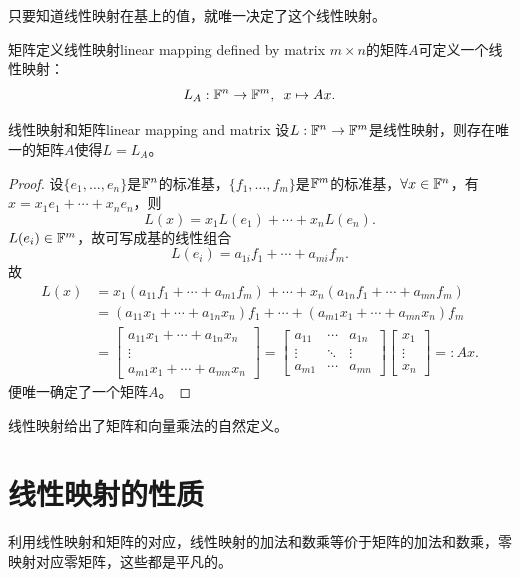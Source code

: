 \begin{remark}
	只要知道线性映射在基上的值，就唯一决定了这个线性映射。
\end{remark}

\begin{example}{矩阵定义线性映射}{linear mapping defined by matrix}
	$m \times n$的矩阵$A$可定义一个线性映射：
	\begin{equation}
		L_A:\mathbb{F}^n \to \mathbb{F}^m,\enspace x \mapsto Ax.
	\end{equation}
\end{example}
\begin{theorem}{线性映射和矩阵}{linear mapping and matrix}
	设$L:\mathbb{F}^n \to \mathbb{F}^m$是线性映射，则存在唯一的矩阵$A$使得$L = L_A$。
\end{theorem}
\begin{proof}
	设$\{e_1,\ldots,e_n\}$是$\mathbb{F}^n$的标准基，$\{f_1,\ldots,f_m\}$是$\mathbb{F}^m$的标准基，$\forall x \in \mathbb{F}^n$，有$x = x_1e_1 + \cdots + x_ne_n$，则
	\[
		L(x) = x_1L(e_1) + \cdots + x_nL(e_n).
	\]
	$L(e_i) \in \mathbb{F}^m$，故可写成基的线性组合
	\[
		L(e_i) = a_{1i}f_1 + \cdots + a_{mi}f_m.
	\]
	故
	\begin{align*}
		L(x) &= x_1(a_{11}f_1 + \cdots + a_{m1}f_m) + \cdots + x_n(a_{1n}f_1 + \cdots + a_{mn}f_m)\\
		&= (a_{11}x_1 + \cdots + a_{1n}x_n)f_1 + \cdots + (a_{m1}x_1 + \cdots + a_{mn}x_n)f_m\\
		&= \begin{bmatrix}
			a_{11}x_1 + \cdots + a_{1n}x_n\\\vdots\\
			a_{m1}x_1 + \cdots + a_{mn}x_n
		\end{bmatrix} = \begin{bmatrix}
			a_{11}&\cdots&a_{1n}\\
			\vdots&\ddots&\vdots\\
			a_{m1}&\cdots&a_{mn}
		\end{bmatrix}\begin{bmatrix}
			x_1\\\vdots\\x_n
		\end{bmatrix} =: Ax.
	\end{align*}
	便唯一确定了一个矩阵$A$。
\end{proof}

\begin{remark}
	线性映射给出了矩阵和向量乘法的自然定义。
\end{remark}

\section{线性映射的性质}
利用线性映射和矩阵的对应，线性映射的加法和数乘等价于矩阵的加法和数乘，零映射对应零矩阵，这些都是平凡的。

